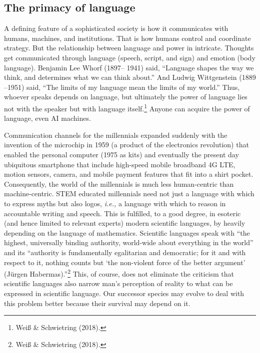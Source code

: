 \begin{multicols}{2}
\subsection*{The primacy of language}

A defining feature of a sophisticated society is how it communicates with humans, machines, and institutions. That is how humans control and coordinate strategy. But the relationship between language and power in intricate. Thoughts get communicated through language (speech, script, and sign) and emotion (body language). Benjamin Lee Whorf (1897– 1941) said, “Language shapes the way we think, and determines what we can think about.” And Ludwig Wittgenstein (1889 –1951) said, “The limits of my language mean the limits of my world.” Thus, whoever speaks depends on language, but ultimately the power of language lies not with the speaker but with language itself.\footnote{Weiß \& Schwietring (2018).}  Anyone can acquire the power of language, even AI machines.

Communication channels for the millennials expanded suddenly with the invention of the microchip in 1959 (a product of the electronics revolution) that enabled the personal computer (1975 as kits) and eventually the present day ubiquitous smartphone that include high-speed mobile broadband 4G LTE, motion sensors, camera, and mobile payment features that fit into a shirt pocket. Consequently, the world of the millennials is much less human-centric than machine-centric. STEM educated millennials need not just a language with which to express myths but also logos, \textit{i.e.,} a language with
which to reason in accountable writing and speech. This is fulfilled, to a good degree, in esoteric (and hence limited to relevant experts) modern scientific languages, by heavily depending on the language of mathematics. Scientific languages speak with “the highest, universally binding authority, world-wide about everything in the world” and its “authority is fundamentally egalitarian and democratic; for it and with respect to it, nothing counts but ‘the non-violent force of the better argument’ (Jürgen Habermas).”\footnote{Weiß \& Schwietring (2018).}  This, of course, does not eliminate the criticism that scientific languages also narrow man's perception of reality to what can be expressed in scientific language. Our successor species may evolve to deal with this problem better because their survival may depend on it. 


\end{multicols}
